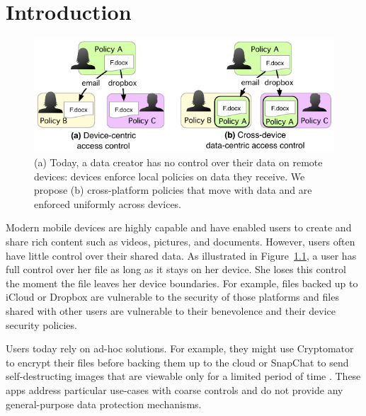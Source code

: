 
\chapter{Introduction}
\label{ch:Introduction}

\begin{figure}
    \centering
    \includegraphics[width=\columnwidth]{fig/tcapsules-contrast2.pdf}
    \caption{(a) Today, a data creator has no control over their data on remote
      devices: devices enforce local policies on data they receive. We propose (b)
      cross-platform policies that move with data and are enforced uniformly
      across devices.}
    \label{fig:ControlBoundaries}
  \end{figure}
  
Modern mobile devices are highly capable and have enabled users to create and
  share rich content such as videos, pictures, and documents. However, users often have little control over their shared data. As illustrated in
  Figure~\ref{fig:ControlBoundaries}, a user has full control over her file as long as it stays on her device. She loses this control the moment the file leaves her device boundaries. For example, files backed up to iCloud or Dropbox are vulnerable to the security of those platforms and files shared with other users are vulnerable to their benevolence and their device security policies.
  
  Users today rely on ad-hoc solutions. For example, they might use
  Cryptomator \cite{cryptomator} to encrypt their files before backing them up to the cloud
  or SnapChat to send self-destructing images that are viewable only for
  a limited period of time \cite{snapchat}. These apps address particular use-cases with
  coarse controls and do not provide any general-purpose data protection
  mechanisms.
  
